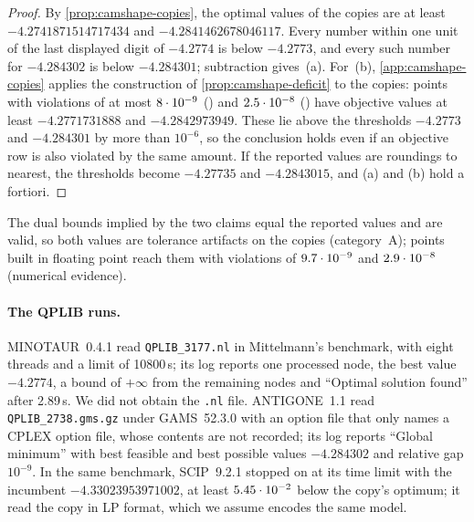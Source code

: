 \begin{proof}
By \cref{prop:camshape-copies}, the optimal values of the copies are at least $-4.2741871514717434$ and $-4.2841462678046117$.
Every number within one unit of the last displayed digit of $-4.2774$ is below $-4.2773$, and every such number for $-4.284302$ is below $-4.284301$; subtraction gives~(a).
For~(b), \cref{app:camshape-copies} applies the construction of \cref{prop:camshape-deficit} to the copies: points with violations of at most $8\cdot 10^{-9}$ () and $2.5\cdot 10^{-8}$ () have objective values at least $-4.2771731888$ and $-4.2842973949$.
These lie above the thresholds $-4.2773$ and $-4.284301$ by more than $10^{-6}$, so the conclusion holds even if an objective row is also violated by the same amount.
If the reported values are roundings to nearest, the thresholds become $-4.27735$ and $-4.2843015$, and (a) and (b) hold a fortiori.
\end{proof}

The dual bounds implied by the two claims equal the reported values and are valid, so both values are tolerance artifacts on the copies (category~A); points built in floating point reach them with violations of $9.7\cdot 10^{-9}$ and $2.9\cdot 10^{-8}$ (numerical evidence).

\paragraph{The QPLIB runs.}
MINOTAUR~0.4.1 read \texttt{QPLIB\_3177.nl} in Mittelmann's benchmark, with eight threads and a limit of 10800\,s; its log reports one processed node, the best value $-4.2774$, a bound of $+\infty$ from the remaining nodes and ``Optimal solution found'' after 2.89\,s.
We did not obtain the \texttt{.nl} file.
ANTIGONE~1.1 read \texttt{QPLIB\_2738.gms.gz} under GAMS~52.3.0 with an option file that only names a CPLEX option file, whose contents are not recorded; its log reports ``Global minimum'' with best feasible and best possible values $-4.284302$ and relative gap $10^{-9}$.
In the same benchmark, SCIP~9.2.1 stopped on  at its time limit with the incumbent $-4.33023953971002$, at least $5.45\cdot 10^{-2}$ below the copy's optimum; it read the copy in LP format, which we assume encodes the same model.

